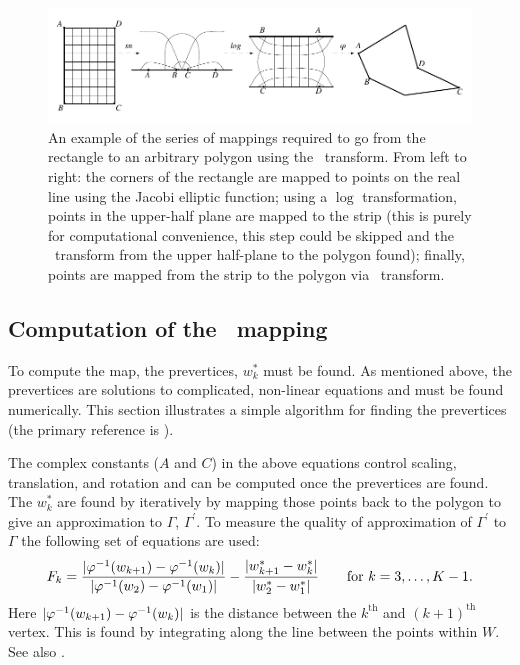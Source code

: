 \begin{figure} [t]
\centering
\includegraphics[width=\textwidth]{sc/figs/rectangledia.pdf}
\caption{An example of the series of mappings required to go from the rectangle to an arbitrary polygon using the \sch\ transform. From left to right: the corners of the rectangle are mapped to points on the real line using the Jacobi elliptic function; using a $\log$ transformation, points in the upper-half plane are mapped to the strip (this is purely for computational convenience, this step could be skipped and the \sch\ transform from the upper half-plane to the polygon found); finally, points are mapped from the strip to the polygon via \sch\ transform.}
\label{rectangledia}
\end{figure}

\subsection{Computation of the \sch\ mapping}
\label{sc-mapping-problem}

To compute the map, the prevertices, $w^*_k$ must be found. \label{cor-3s17}As mentioned above, the prevertices are solutions to complicated, non-linear equations and must be found numerically. This section illustrates a simple algorithm for finding the prevertices (the primary reference is ).

The complex constants ($A$ and $C$) in the above equations control scaling, translation, and rotation and can \label{cor-r29-3}be computed once the prevertices are found. The $w^*_k$ are found by iteratively by mapping those points back to the polygon to give an approximation to $\Gamma$, $\Gamma^\prime$. To measure the quality of approximation of $\Gamma^\prime$ to $\Gamma$ the following set of equations are used:
\begin{equation}
\label{optimizeme}
F_k = \frac{\vert \varphi^{-1}(w_{k+1}) -  \varphi^{-1}(w_k) \vert}{\vert \varphi^{-1}(w_2)-\varphi^{-1}(w_1)\vert} - \frac{\vert w^*_{k+1} - w^*_k\vert}{\vert w^*_2 - w^*_1\vert} \qquad \text{for } k=3,\dots,K-1.
\end{equation}
Here $\vert \varphi^{-1}(w_{k+1}) -  \varphi^{-1}(w_k) \vert$ is the distance between the $k^{\text{th}}$ and $(k+1)^{\text{th}}$ vertex. This is found by integrating along the line between the points within $W$. See also .

